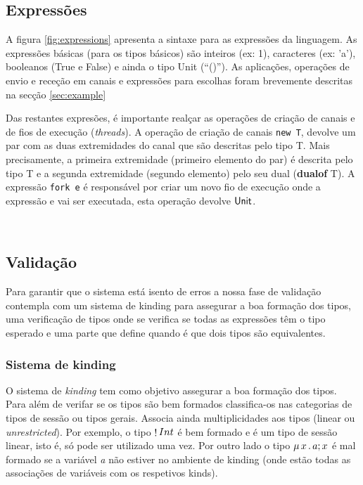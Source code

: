\subsection{Expressões}
A figura \ref{fig:expressions} apresenta a sintaxe para as expressões da linguagem. As expressões básicas (para os tipos básicos) são inteiros (ex: 1), caracteres (ex: 'a'), booleanos (True e False) e ainda o tipo Unit (``()'').
As aplicações, operações de envio e receção em canais e expressões para escolhas foram brevemente descritas na secção \ref{sec:example}

Das restantes expresões, é importante realçar as operações de criação de canais e de fios de execução (\textit{threads}).
A operação de criação de canais \lstinline"new T", devolve um par com as duas extremidades do canal que são descritas pelo tipo T. Mais precisamente, a primeira extremidade (primeiro elemento do par) é descrita pelo tipo T e a segunda extremidade (segundo elemento) pelo seu dual (\textbf{dualof} T).
A expressão \lstinline"fork e" é responsável por criar um novo fio de execução onde a expressão e vai ser executada, esta operação devolve $\mathsf{Unit}$.


\\
\subsection{Validação}

Para garantir que o sistema está isento de erros a nossa fase de validação contempla com um sistema de kinding para assegurar a boa formação dos tipos, uma verificação de tipos onde se verifica se todas as expressões têm o tipo esperado e uma parte que define quando é que dois tipos são equivalentes.

\subsubsection{Sistema de kinding}
O sistema de \textit{kinding} tem como objetivo assegurar a boa formação dos tipos. Para além de verifar se os tipos são bem formados classifica-os nas categorias de tipos de sessão ou tipos gerais. Associa ainda multiplicidades aos tipos (linear ou \textit{unrestricted}).
Por exemplo, o tipo $\mathop! Int$ é bem formado e é um tipo de sessão linear, isto é, só pode ser utilizado uma vez. Por outro lado o tipo $\mu\,x\,.\,a;x$ é mal formado se a variável \textit{a} não estiver no ambiente de kinding (onde estão todas as associações de variáveis com os respetivos kinds).

